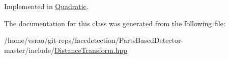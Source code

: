 Implemented in \hyperlink{classQuadratic_ae1f3f6d71209aafe6bb1636a8c17489c}{Quadratic}.



The documentation for this class was generated from the following file\-:\begin{DoxyCompactItemize}
\item 
/home/vsrao/git-\/reps/facedetection/\-Parts\-Based\-Detector-\/master/include/\hyperlink{DistanceTransform_8hpp}{Distance\-Transform.\-hpp}\end{DoxyCompactItemize}
